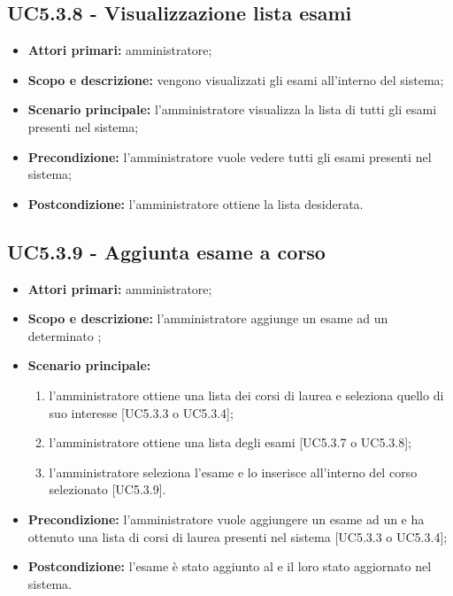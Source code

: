 \documentclass[AnalisiDeiRequisiti.tex]{subfiles}
\begin{document}
\subsection{UC5.3.8 - Visualizzazione lista esami}
\begin{itemize}
	\item \textbf{Attori primari:} amministratore;
	\item \textbf{Scopo e descrizione:} vengono visualizzati gli esami all'interno del sistema;
	\item \textbf{Scenario principale:} l'amministratore visualizza la lista di tutti gli esami presenti nel sistema;
	\item \textbf{Precondizione:} l'amministratore vuole vedere tutti gli esami presenti nel sistema; 
	\item \textbf{Postcondizione:} l'amministratore ottiene la lista desiderata.
\end{itemize}
\subsection{UC5.3.9 - Aggiunta esame a corso}
\begin{itemize}
	\item \textbf{Attori primari:} amministratore;
	\item \textbf{Scopo e descrizione:} l'amministratore aggiunge un esame ad un determinato ;
	\item \textbf{Scenario principale:}
		\begin{enumerate}
			\item l'amministratore ottiene una lista dei corsi di laurea e seleziona quello di suo interesse [UC5.3.3 o UC5.3.4];
			\item l'amministratore ottiene una lista degli esami [UC5.3.7 o UC5.3.8];
			\item l'amministratore seleziona l'esame e lo inserisce all'interno del corso selezionato [UC5.3.9].
		\end{enumerate}
	\item \textbf{Precondizione:} l'amministratore vuole aggiungere un esame ad un  e ha ottenuto una lista di corsi di laurea presenti nel sistema [UC5.3.3 o UC5.3.4]; 
	\item \textbf{Postcondizione:} l'esame è stato aggiunto al  e il loro stato aggiornato nel sistema.
\end{itemize}
\end{document}
